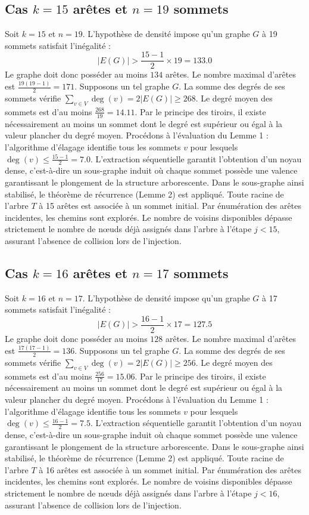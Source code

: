 \documentclass[12pt,a4paper]{article}
\begin{document}
\subsection{Cas $k = 15$ arêtes et $n = 19$ sommets}
Soit $k = 15$ et $n = 19$. L'hypothèse de densité impose qu'un graphe $G$ à 19 sommets satisfait l'inégalité :
$$ |E(G)| > \frac{15-1}{2} \times 19 = 133.0 $$
Le graphe doit donc posséder au moins $134$ arêtes. Le nombre maximal d'arêtes est $\frac{19(19-1)}{2} = 171$.
Supposons un tel graphe $G$. La somme des degrés de ses sommets vérifie $\sum_{v \in V} \deg(v) = 2|E(G)| \geq 268$.
Le degré moyen des sommets est d'au moins $\frac{268}{19} = 14.11$.
Par le principe des tiroirs, il existe nécessairement au moins un sommet dont le degré est supérieur ou égal à la valeur plancher du degré moyen.
Procédons à l'évaluation du Lemme 1 : l'algorithme d'élagage identifie tous les sommets $v$ pour lesquels $\deg(v) \leq \frac{15-1}{2} = 7.0$.
L'extraction séquentielle garantit l'obtention d'un noyau dense, c'est-à-dire un sous-graphe induit où chaque sommet possède une valence garantissant le plongement de la structure arborescente.
Dans le sous-graphe ainsi stabilisé, le théorème de récurrence (Lemme 2) est appliqué. Toute racine de l'arbre $T$ à 15 arêtes est associée à un sommet initial. Par énumération des arêtes incidentes, les chemins sont explorés. Le nombre de voisins disponibles dépasse strictement le nombre de nœuds déjà assignés dans l'arbre à l'étape $j < 15$, assurant l'absence de collision lors de l'injection.

\subsection{Cas $k = 16$ arêtes et $n = 17$ sommets}
Soit $k = 16$ et $n = 17$. L'hypothèse de densité impose qu'un graphe $G$ à 17 sommets satisfait l'inégalité :
$$ |E(G)| > \frac{16-1}{2} \times 17 = 127.5 $$
Le graphe doit donc posséder au moins $128$ arêtes. Le nombre maximal d'arêtes est $\frac{17(17-1)}{2} = 136$.
Supposons un tel graphe $G$. La somme des degrés de ses sommets vérifie $\sum_{v \in V} \deg(v) = 2|E(G)| \geq 256$.
Le degré moyen des sommets est d'au moins $\frac{256}{17} = 15.06$.
Par le principe des tiroirs, il existe nécessairement au moins un sommet dont le degré est supérieur ou égal à la valeur plancher du degré moyen.
Procédons à l'évaluation du Lemme 1 : l'algorithme d'élagage identifie tous les sommets $v$ pour lesquels $\deg(v) \leq \frac{16-1}{2} = 7.5$.
L'extraction séquentielle garantit l'obtention d'un noyau dense, c'est-à-dire un sous-graphe induit où chaque sommet possède une valence garantissant le plongement de la structure arborescente.
Dans le sous-graphe ainsi stabilisé, le théorème de récurrence (Lemme 2) est appliqué. Toute racine de l'arbre $T$ à 16 arêtes est associée à un sommet initial. Par énumération des arêtes incidentes, les chemins sont explorés. Le nombre de voisins disponibles dépasse strictement le nombre de nœuds déjà assignés dans l'arbre à l'étape $j < 16$, assurant l'absence de collision lors de l'injection.
\end{document}
